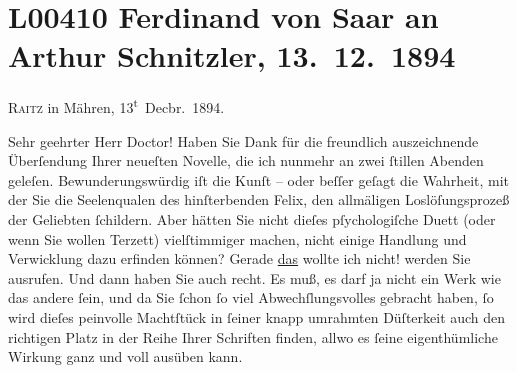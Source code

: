 

\section[Ferdinand von Saar an Arthur Schnitzler, 13. 12. 1894]{L00410 Ferdinand von Saar an Arthur Schnitzler, 13. 12. 1894}
\nopagebreak{}
\rehead{ }\normalsize\beginnumbering{}
\toendnotes[C]{\smallbreak\pagebreak[2]}
\toendnotes[C]{\smallbreak}
\toendnotes[C]{\smallbreak}
\pstart
           \raggedleft{}{\pb}\textsc{Raitz} in Mähren, 13\textsuperscript{t} Decbr. 1894.\pend
           
\pstart{}Sehr geehrter Herr Doctor!\pend\vspace{0.5em}
\pstart
           Haben Sie Dank für die freundlich auszeichnende Überſendung Ihrer neueſten Novelle, die ich nunmehr an zwei{ }ſtillen Abenden
               geleſen. Bewunderungswürdig iſt die Kunſt – oder beſſer geſagt die Wahrheit, mit der
               Sie die Seelenqualen des hinſterbenden Felix, den allmäligen Loslöſungsprozeß der Geliebten{ }ſchildern. Aber hätten Sie nicht dieſes pſychologiſche Duett (oder wenn Sie wollen
               Terzett) vielſtimmiger machen, nicht einige Handlung und Verwicklung dazu erfinden
               können? Gerade \uline{das} wollte ich nicht! werden Sie
               ausrufen. Und dann haben Sie auch recht. Es muß, es darf ja nicht ein Werk wie das
                  {\pb}andere{ }ſein, und da Sie{ }ſchon{ }ſo viel
               Abwechſlungsvolles gebracht haben,{ }ſo wird dieſes peinvolle Machtſtück in{ }ſeiner
               knapp umrahmten Düſterkeit \introOben{}auch\introOben{} den richtigen Platz in der
               Reihe Ihrer Schriften finden, allwo es{ }ſeine eigenthümliche Wirkung ganz und voll
               ausüben kann.\pend
           
